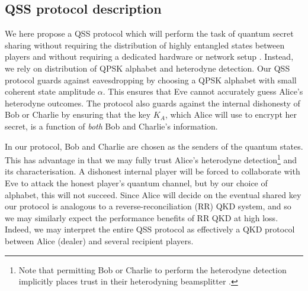\subsection{QSS protocol description}

We here propose a QSS protocol which will perform the task of quantum secret sharing without requiring the distribution of highly entangled states between players \cite{Kogias2017} and without requiring a dedicated hardware or network setup \cite{Grice2019}. Instead, we rely on distribution of QPSK alphabet and heterodyne detection. Our QSS protocol guards against eavesdropping by choosing a QPSK alphabet with small coherent state amplitude $\alpha$. This ensures that Eve cannot accurately guess Alice's heterodyne outcomes. The protocol also guards against the internal dishonesty of Bob or Charlie by ensuring that the key $K_A$, which Alice will use to encrypt her secret, is a function of \emph{both} Bob and Charlie's information.

In our protocol, Bob and Charlie are chosen as the senders of the quantum states. This has advantage in that we may fully trust Alice's heterodyne detection\footnote{Note that permitting Bob or Charlie to perform the heterodyne detection implicitly places trust in their heterodyning beamsplitter \cite{Walk2016a}. 

} and its characterisation. A dishonest internal player will be forced to collaborate with Eve to attack the honest player's quantum channel, but by our choice of alphabet, this will not succeed. Since Alice will decide on the eventual shared key our protocol is analogous to a reverse-reconciliation (RR) QKD system, and so we may similarly expect the performance benefits of RR QKD at high loss. Indeed, we may interpret the entire QSS protocol as effectively a QKD protocol between Alice (dealer) and several recipient players.

